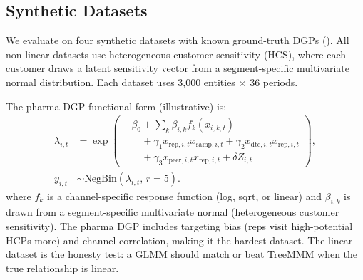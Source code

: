 \documentclass[review,12pt]{elsarticle}
\begin{document}
\subsection{Synthetic Datasets}
\label{sec:design:datasets}

We evaluate on four synthetic datasets with known ground-truth DGPs
(). All non-linear datasets use heterogeneous customer
sensitivity (HCS), where each customer draws a latent sensitivity vector from a
segment-specific multivariate normal distribution. Each dataset uses 3,000
entities $\times$ 36 periods.

\begin{table}[ht]
\centering
\caption{Synthetic dataset specifications.}
\label{tab:datasets}
\end{table}

The pharma DGP functional form (illustrative) is:
\begin{equation}
\label{eq:pharma_dgp}
\begin{split}
\lambda_{i,t}
  &= \exp\!\left(
  \begin{aligned}
  &\beta_0 + \sum_k \beta_{i,k} f_k(x_{i,k,t}) \\
  &\quad + \gamma_1 x_{\text{rep},i,t} x_{\text{samp},i,t}
          + \gamma_2 x_{\text{dtc},i,t} x_{\text{rep},i,t} \\
  &\quad + \gamma_3 x_{\text{peer},i,t} x_{\text{rep},i,t}
          + \delta Z_{i,t}
  \end{aligned}
  \right), \\
y_{i,t}
  &\sim \text{NegBin}(\lambda_{i,t},\, r{=}5).
\end{split}
\end{equation}
where $f_k$ is a channel-specific response function (log, sqrt, or linear) and
$\beta_{i,k}$ is drawn from a segment-specific multivariate normal
(heterogeneous customer sensitivity). The pharma DGP includes targeting bias
\cite{manchanda2004response}
(reps visit high-potential HCPs more) and channel correlation, making it the
hardest dataset. The linear dataset is the honesty test: a GLMM should match
or beat TreeMMM when the true relationship is linear.
\end{document}
